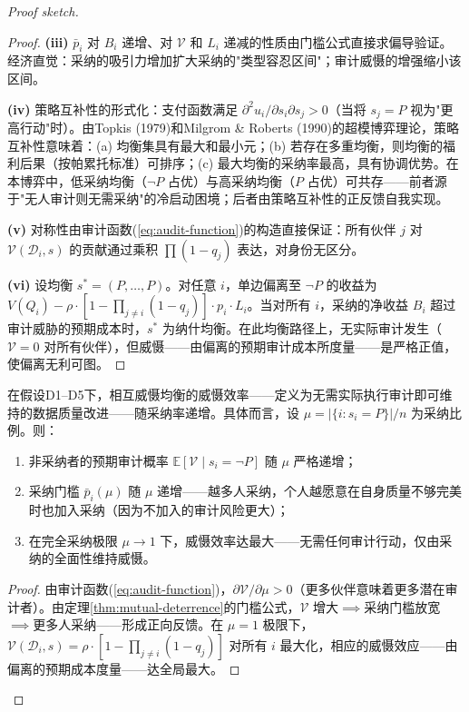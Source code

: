 \documentclass[12pt,a4paper]{ctexart}
\theoremstyle{definition}
\theoremstyle{remark}
\begin{document}
\begin{proof}[Proof sketch]
\begin{proof}
\textbf{(iii)} $\bar{p}_i$ 对 $B_i$ 递增、对 $\mathcal{V}$ 和 $L_i$ 递减的性质由门槛公式直接求偏导验证。经济直觉：采纳的吸引力增加扩大采纳的"类型容忍区间"；审计威慑的增强缩小该区间。

\textbf{(iv)} 策略互补性的形式化：支付函数满足 $\partial^2 u_i / \partial s_i \partial s_j > 0$（当将 $s_j = P$ 视为"更高行动"时）。由Topkis (1979)和Milgrom \& Roberts (1990)的超模博弈理论，策略互补性意味着：(a) 均衡集具有最大和最小元；(b) 若存在多重均衡，则均衡的福利后果（按帕累托标准）可排序；(c) 最大均衡的采纳率最高，具有协调优势。在本博弈中，低采纳均衡（$\neg P$ 占优）与高采纳均衡（$P$ 占优）可共存——前者源于"无人审计则无需采纳"的冷启动困境；后者由策略互补性的正反馈自我实现。

\textbf{(v)} 对称性由审计函数(\ref{eq:audit-function})的构造直接保证：所有伙伴 $j$ 对 $\mathcal{V}(\mathcal{D}_i, s)$ 的贡献通过乘积 $\prod (1 - q_j)$ 表达，对身份无区分。

\textbf{(vi)} 设均衡 $s^* = (P, \ldots, P)$。对任意 $i$，单边偏离至 $\neg P$ 的收益为 $V(Q_i) - \rho \cdot [1 - \prod_{j \neq i} (1 - q_j)] \cdot p_i \cdot L_i$。当对所有 $i$，采纳的净收益 $B_i$ 超过审计威胁的预期成本时，$s^*$ 为纳什均衡。在此均衡路径上，无实际审计发生（$\mathcal{V} = 0$ 对所有伙伴），但威慑——由偏离的预期审计成本所度量——是严格正值，使偏离无利可图。
\end{proof}

\begin{corollary}[审计之剑的威慑效率]
\label{cor:deterrence-efficiency}
在假设D1--D5下，相互威慑均衡的威慑效率——定义为无需实际执行审计即可维持的数据质量改进——随采纳率递增。具体而言，设 $\mu = |\{i: s_i = P\}| / n$ 为采纳比例。则：
\begin{enumerate}[label=(\roman*)]
\item 非采纳者的预期审计概率 $\mathbb{E}[\mathcal{V} \mid s_i = \neg P]$ 随 $\mu$ 严格递增；
\item 采纳门槛 $\bar{p}_i(\mu)$ 随 $\mu$ 递增——越多人采纳，个人越愿意在自身质量不够完美时也加入采纳（因为不加入的审计风险更大）；
\item 在完全采纳极限 $\mu \to 1$ 下，威慑效率达最大——无需任何审计行动，仅由采纳的全面性维持威慑。
\end{enumerate}
\end{corollary}

\begin{proof}
由审计函数(\ref{eq:audit-function})，$\partial \mathcal{V} / \partial \mu > 0$（更多伙伴意味着更多潜在审计者）。由定理\ref{thm:mutual-deterrence}的门槛公式，$\mathcal{V}$ 增大$\implies$采纳门槛放宽$\implies$更多人采纳——形成正向反馈。在 $\mu = 1$ 极限下，$\mathcal{V}(\mathcal{D}_i, s) = \rho \cdot [1 - \prod_{j \neq i} (1 - q_j)]$ 对所有 $i$ 最大化，相应的威慑效应——由偏离的预期成本度量——达全局最大。
\end{proof}


\end{proof}
\end{document}
